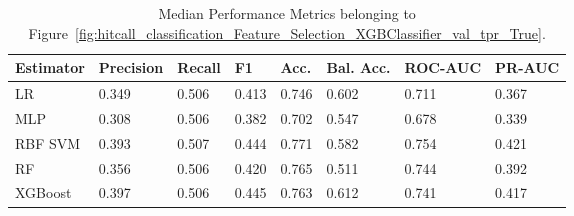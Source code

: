 \begin{longtable}{llllllll}
\caption{Median Performance Metrics belonging to Figure~\ref{fig:hitcall_classification_Feature_Selection_XGBClassifier_val_tpr_True}.}\label{tab:table:hitcall_classification_feature_selection_xgbclassifier_val_tpr_true}\\
\toprule
\midrule
\small Estimator & \small Precision & \small Recall & \small F1 & \small Acc. & \small Bal. Acc. & \small ROC-AUC & \small PR-AUC\\
\hline
LR & 0.349 & 0.506 & 0.413 & 0.746 & 0.602 & 0.711 & 0.367\\
MLP & 0.308 & 0.506 & 0.382 & 0.702 & 0.547 & 0.678 & 0.339\\
RBF SVM & 0.393 & 0.507 & 0.444 & 0.771 & 0.582 & 0.754 & 0.421\\
RF & 0.356 & 0.506 & 0.420 & 0.765 & 0.511 & 0.744 & 0.392\\
XGBoost & 0.397 & 0.506 & 0.445 & 0.763 & 0.612 & 0.741 & 0.417\\
\bottomrule
\end{longtable}